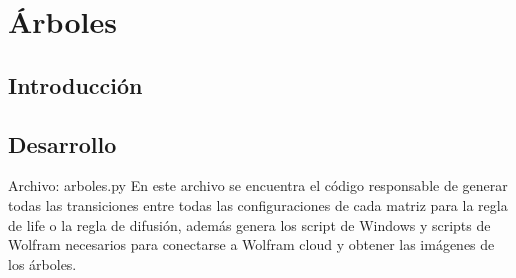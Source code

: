 \section{Árboles}
\subsection{Introducción}

\subsection{Desarrollo}
Archivo: arboles.py
En este archivo se encuentra el código responsable de generar todas las transiciones entre todas las configuraciones de cada matriz para la regla de life o la regla de difusión, además genera los script de Windows y scripts de Wolfram necesarios para conectarse a Wolfram cloud y obtener las imágenes de los árboles.
